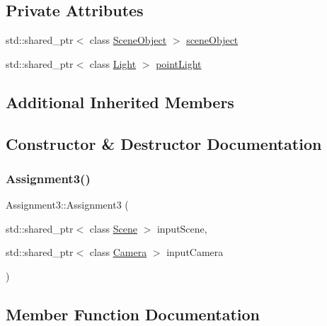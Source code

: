 \subsection*{Private Attributes}
\begin{DoxyCompactItemize}
\item
std\+::shared\+\_\+ptr$<$ class \hyperlink{class_scene_object}{Scene\+Object} $>$ \hyperlink{class_assignment3_a0bc175d3efff30c5f4aa3ffa1272338a}{scene\+Object}
\item
std\+::shared\+\_\+ptr$<$ class \hyperlink{class_light}{Light} $>$ \hyperlink{class_assignment3_ad1cf5a76d62b5a1ed17e66c31e0feb98}{point\+Light}
\end{DoxyCompactItemize}
\subsection*{Additional Inherited Members}


\subsection{Constructor \& Destructor Documentation}
\hypertarget{class_assignment3_adb8e9ac0681c600affc3370f5e5422b2}{}\label{class_assignment3_adb8e9ac0681c600affc3370f5e5422b2}
\subsubsection{\texorpdfstring{Assignment3()}{Assignment3()}}
{\footnotesize\ttfamily Assignment3\+::\+Assignment3 (\begin{DoxyParamCaption}\item[{std\+::shared\+\_\+ptr$<$ class \hyperlink{class_scene}{Scene} $>$}]{input\+Scene,  }\item[{std\+::shared\+\_\+ptr$<$ class \hyperlink{class_camera}{Camera} $>$}]{input\+Camera }\end{DoxyParamCaption})}



\subsection{Member Function Documentation}
\hypertarget{class_assignment3_a12b30bd7b8a0bcefbd977f126ce00b25}{}\label{class_assignment3_a12b30bd7b8a0bcefbd977f126ce00b25}
